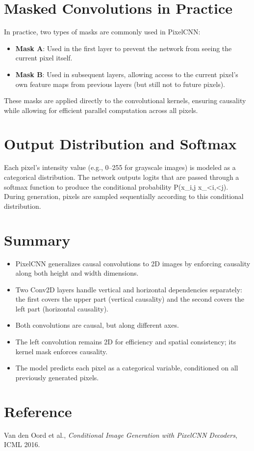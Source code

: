 \documentclass[11pt,a4paper]{article}
\begin{document}
\section*{Masked Convolutions in Practice}
In practice, two types of masks are commonly used in PixelCNN:
\begin{itemize}
\item \textbf{Mask A}: Used in the first layer to prevent the network from seeing the current pixel itself.
\item \textbf{Mask B}: Used in subsequent layers, allowing access to the current pixel’s own feature maps from previous layers (but still not to future pixels).
\end{itemize}

These masks are applied directly to the convolutional kernels, ensuring causality while allowing for efficient parallel computation across all pixels.

\section*{Output Distribution and Softmax}
Each pixel’s intensity value (e.g., 0–255 for grayscale images) is modeled as a categorical distribution. The network outputs logits that are passed through a softmax function to produce the conditional probability P(x_{i,j} \mid x_{<i,<j}). During generation, pixels are sampled sequentially according to this conditional distribution.

\section*{Summary}
\begin{itemize}
\item PixelCNN generalizes causal convolutions to 2D images by enforcing causality along both height and width dimensions.
\item Two Conv2D layers handle vertical and horizontal dependencies separately: the first covers the upper part (vertical causality) and the second covers the left part (horizontal causality).
\item Both convolutions are causal, but along different axes.
\item The left convolution remains 2D for efficiency and spatial consistency; its kernel mask enforces causality.
\item The model predicts each pixel as a categorical variable, conditioned on all previously generated pixels.
\end{itemize}

\section*{Reference}
Van den Oord et al., \textit{Conditional Image Generation with PixelCNN Decoders}, ICML 2016.
\end{document}

